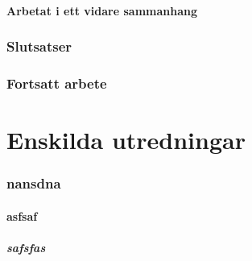 \documentclass{article}
\begin{document}
\subsection{Arbetat i ett vidare sammanhang}

\section{Slutsatser}

\section{Fortsatt arbete}

\part{Enskilda utredningar}
\renewcommand{\thesection}{\Alph{section}}	

\section{nansdna}
\subsection{asfsaf}
\subsubsection{safsfas}
\end{document}
